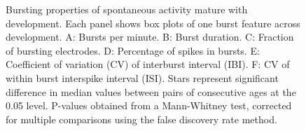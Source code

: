 \documentclass{article}\usepackage[]{graphicx}\usepackage[]{color}
\begin{document}
\begin{figure}
  \centering
  \caption{Bursting properties of spontaneous activity mature with
    development.  Each panel shows box plots of one burst feature
    across development. A: Bursts
    per minute. B: Burst duration. C: Fraction of bursting electrodes. D: Percentage of spikes in
    bursts.  E: Coefficient of variation (CV) of interburst interval
    (IBI).  F: CV of within burst interspike interval (ISI). Stars represent significant difference in median values between pairs of consecutive ages at the 0.05 level. P-values obtained from a Mann-Whitney test, corrected for multiple comparisons using the false discovery rate method.}
\end{figure}
\end{document}
